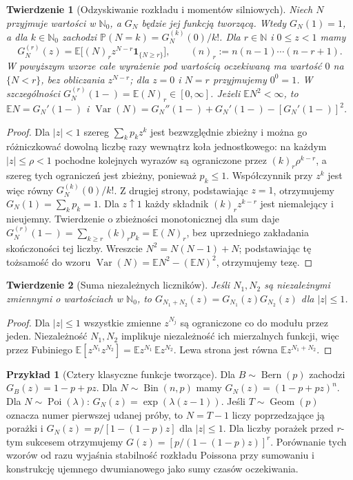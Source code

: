 \documentclass[11pt,a4paper,oneside]{report}
\numberwithin{equation}{chapter}
\theoremstyle{plain}
\newtheorem{twierdzenie}{Twierdzenie}[chapter]
\theoremstyle{definition}
\newtheorem{przyklad}{Przykład}[chapter]
\theoremstyle{remark}
\newcommand{\N}{\mathbb{N}}
\newcommand{\Prob}{\mathbb{P}}
\newcommand{\E}{\mathbb{E}}
\newcommand{\Var}{\operatorname{Var}}
\newcommand{\ind}[1]{\mathbf{1}_{#1}}
\newcommand{\Bin}{\operatorname{Bin}}
\newcommand{\Poi}{\operatorname{Poi}}
\newcommand{\Geom}{\operatorname{Geom}}
\begin{document}
\begin{twierdzenie}[Odzyskiwanie rozkładu i momentów silniowych]
Niech $N$ przyjmuje wartości w $\N_0$, a $G_N$ będzie jej
funkcją tworzącą. Wtedy $G_N(1)=1$, a dla $k\in\N_0$
zachodzi $\Prob(N=k)=G_N^{(k)}(0)/k!$.
Dla $r\in\N$ i $0\leq z<1$ mamy
\[
G_N^{(r)}(z)=\E\bigl[(N)_r z^{N-r}\ind{\{N\geq r\}}\bigr],
\qquad (n)_r:=n(n-1)\cdots(n-r+1).
\]
W powyższym wzorze całe wyrażenie pod wartością oczekiwaną
ma wartość $0$ na $\{N<r\}$, bez obliczania $z^{N-r}$;
dla $z=0$ i $N=r$ przyjmujemy $0^0=1$.
W szczególności $G_N^{(r)}(1-)=\E(N)_r\in[0,\infty]$.
Jeżeli $\E N^2<\infty$, to
$\E N=G_N'(1-)$ i
$\Var(N)=G_N''(1-)+G_N'(1-)-[G_N'(1-)]^2$.
\end{twierdzenie}
\begin{proof}
Dla $|z|<1$ szereg $\sum_k p_kz^k$ jest bezwzględnie
zbieżny i można go różniczkować dowolną liczbę razy
wewnątrz koła jednostkowego: na każdym $|z|\leq\rho<1$
pochodne kolejnych wyrazów są ograniczone przez
$(k)_r\rho^{k-r}$, a szereg tych ograniczeń jest zbieżny,
ponieważ $p_k\leq1$. Współczynnik przy $z^k$ jest więc
równy $G_N^{(k)}(0)/k!$. Z drugiej strony, podstawiając
$z=1$, otrzymujemy $G_N(1)=\sum_kp_k=1$.
Dla $z\uparrow1$ każdy składnik $(k)_rz^{k-r}$ jest
niemalejący i nieujemny. Twierdzenie o zbieżności
monotonicznej dla sum daje
$G_N^{(r)}(1-)=\sum_{k\geq r}(k)_rp_k=\E(N)_r$,
bez uprzedniego zakładania skończoności tej liczby.
Wreszcie $N^2=N(N-1)+N$; podstawiając tę tożsamość
do wzoru $\Var(N)=\E N^2-(\E N)^2$, otrzymujemy tezę.
\end{proof}

\begin{twierdzenie}[Suma niezależnych liczników]
Jeśli $N_1,N_2$ są niezależnymi zmiennymi o wartościach
w $\N_0$, to $G_{N_1+N_2}(z)=G_{N_1}(z)G_{N_2}(z)$
dla $|z|\leq1$.
\end{twierdzenie}
\begin{proof}
Dla $|z|\leq1$ wszystkie zmienne $z^{N_j}$ są ograniczone
co do modułu przez jeden. Niezależność $N_1,N_2$ implikuje
niezależność ich mierzalnych funkcji, więc przez Fubiniego
$\E[z^{N_1}z^{N_2}]=\E z^{N_1}\,\E z^{N_2}$.
Lewa strona jest równa $\E z^{N_1+N_2}$.
\end{proof}

\begin{przyklad}[Cztery klasyczne funkcje tworzące]
Dla $B\sim\operatorname{Bern}(p)$ zachodzi
$G_B(z)=1-p+pz$. Dla $N\sim\Bin(n,p)$ mamy
$G_N(z)=(1-p+pz)^n$. Dla $N\sim\Poi(\lambda)$:
$G_N(z)=\exp(\lambda(z-1))$.
Jeśli $T\sim\Geom(p)$ oznacza numer pierwszej udanej próby,
to $N=T-1$ liczy poprzedzające ją porażki i
$G_N(z)=p/[1-(1-p)z]$ dla $|z|\leq1$.
Dla liczby porażek przed $r$-tym sukcesem otrzymujemy
$G(z)=[p/(1-(1-p)z)]^r$.
Porównanie tych wzorów od razu wyjaśnia stabilność
rozkładu Poissona przy sumowaniu i konstrukcję
ujemnego dwumianowego jako sumy czasów oczekiwania.
\end{przyklad}
\end{document}
